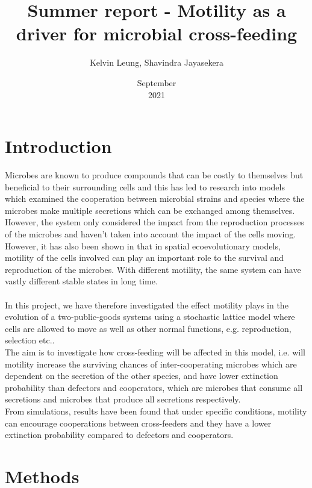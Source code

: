 \documentclass[11pt]{article}
\title{Summer report - Motility as a driver for microbial cross-feeding }
\date{September\\2021}
\author{Kelvin Leung, Shavindra Jayasekera}
\begin{document}
\maketitle
\section{Introduction}
Microbes are known to produce compounds that can be costly to themselves but beneficial to their surrounding cells and this has led to research \cite{oliveira} into models which examined the cooperation between microbial strains and species where the microbes make multiple secretions which can be exchanged among themselves. However, the system only considered the impact from the reproduction processes of the microbes and haven't taken into account the impact of the cells moving. \\
However, it has also been shown in \cite{rps}\cite{wakano} that in spatial ecoevolutionary models, motility of the cells involved can play an important role to the survival and reproduction of the microbes. With different motility, the same system can have vastly different stable states in long time.\\\\
In this project, we have therefore investigated the effect motility plays in the evolution of a two-public-goods systems using a stochastic lattice model where cells are allowed to move as well as other normal functions, e.g. reproduction, selection etc..\\
The aim is to investigate how cross-feeding will be affected in this model, i.e. will motility increase the surviving chances of inter-cooperating microbes which are dependent on the secretion of the other species, and have lower extinction probability than defectors and cooperators, which are microbes that consume all secretions and microbes that produce all secretions respectively.\\
From simulations, results have been found that under specific conditions, motility can encourage cooperations between cross-feeders and they have a lower extinction probability compared to defectors and cooperators.
\section{Methods}
\end{document}
